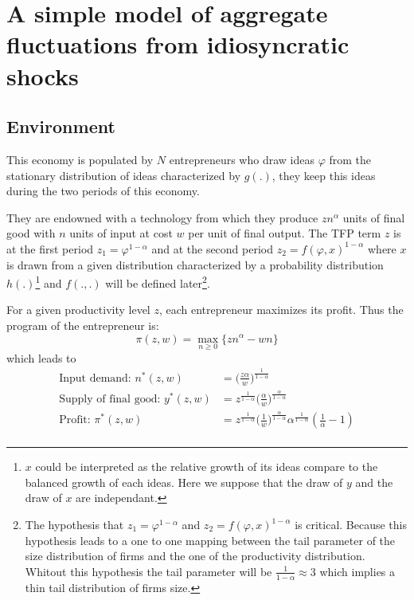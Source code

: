 \documentclass[12pt]{article}
\begin{document}


\section{A simple model of aggregate fluctuations from idiosyncratic shocks}

\subsection{Environment}
This economy is populated by $N$ entrepreneurs who draw ideas $\varphi$ from the stationary distribution of ideas characterized by $g(.)$, they keep this ideas during the two periods of this economy.

They are endowned with a technology from which they produce $z n^{\alpha} $ units of final good with $n$ units of input at cost $w$ per unit of final output. The TFP term $z$ is at the first period $z_1=\varphi^{1-\alpha}$ and at the second period $z_2 = f(\varphi, x)^{1-\alpha}$ where $x$ is drawn from a given distribution characterized by a probability distribution $h(.)$\footnote{$x$ could be interpreted as the relative growth of its ideas compare to the balanced growth of each ideas. Here we suppose that the draw of $y$ and the draw of $x$ are independant.} and $f(.,.)$ will be defined later\footnote{The hypothesis that $z_1=\varphi^{1-\alpha}$ and $z_2 = f(\varphi, x)^{1-\alpha}$ is critical. Because this hypothesis leads to a one to one mapping between the tail parameter of the size distribution of firms and the one of the productivity distribution. Whitout this hypothesis the tail parameter will be $\frac{1}{1-\alpha} \approx 3$ which implies a thin tail distribution of firms size.}.

For a given productivity level $z$, each entrepreneur maximizes its profit. Thus the program of the entrepreneur is:
\begin{equation*}
\pi (z,w) = \max_{n\geq 0} \{ z n^{\alpha} - w n\} 
\end{equation*}
which leads to 
\begin{align*}
\text{Input demand:   }  n^*(z,w) &=  \Big( \frac{z \alpha}{w} \Big)^{\frac{1}{1-\alpha}}  \\
\text{Supply of final good:   }y^*(z,w) &= z^{\frac{1}{1-\alpha}} \big( \frac{\alpha}{w} \big)^{\frac{\alpha}{1-\alpha}}\\
\text{Profit:   }\pi^*(z,w) &= z^{\frac{1}{1-\alpha}} \big( \frac{1}{w} \big)^{\frac{\alpha}{1-\alpha}} \alpha^{\frac{1}{1-\alpha}} (\frac{1}{\alpha}-1)\\
\end{align*}
\end{document}
